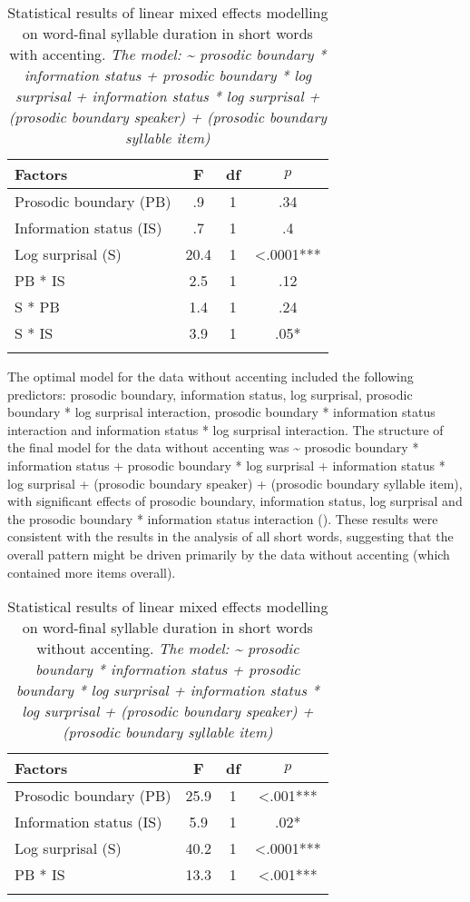 \documentclass[output=paper,colorlinks,citecolor=brown]{langscibook}
\begin{document}
\begin{table}
\begin{tabular}{l S[table-format=2.1] c S[table-format=<1.4{***}]}
\lsptoprule
 {F}actors & {F} & df & {$p$}\\ \midrule
 Prosodic boundary (PB) & .9 & 1 & .34\\
 Information status (IS) & .7 & 1 & .4\\
 Log surprisal (S) & 20.4 & 1 & <.0001{***}\\
 PB * IS & 2.5 & 1 & .12\\
 S * PB & 1.4 & 1 & .24\\
 S * IS & 3.9 & 1 & .05{*}\\
\lspbottomrule
\end{tabular}
\caption{Statistical results of linear mixed effects modelling on word-final syllable duration in short words with accenting. \textit{The model: {\textasciitilde} prosodic boundary * information status + prosodic boundary * log surprisal + information status * log surprisal + (prosodic boundary {\textbar} speaker) + (prosodic boundary {\textbar} syllable item)}}
\label{table:4}
\end{table}

The optimal model for the data without accenting included the following predictors: prosodic boundary, information status, log surprisal, prosodic boundary * log surprisal interaction, prosodic boundary * information status interaction and information status * log surprisal interaction. The structure of the final model for the data without accenting was {\textasciitilde} prosodic boundary * information status + prosodic boundary * log surprisal + information status * log surprisal + (prosodic boundary {\textbar} speaker) + (prosodic boundary {\textbar} syllable item), with significant effects of prosodic boundary, information status, log surprisal and the prosodic boundary * information status interaction (). These results were consistent with the results in the analysis of all short words, suggesting that the overall pattern might be driven primarily by the data without accenting (which contained more items overall).

\begin{table}
\begin{tabular}{l S[table-format=2.1] c S[table-format=<1.4{***}]}
\lsptoprule
 {F}actors & {F} & df & {$p$}\\ \midrule
 Prosodic boundary (PB) & 25.9 & 1 & <.001{***}\\
 Information status (IS) & 5.9 & 1 & .02{*}\\
 Log surprisal (S) & 40.2 & 1 & <.0001{***}\\
 PB * IS & 13.3 & 1 & <.001{***}\\
\lspbottomrule
\end{tabular}
\caption{Statistical results of linear mixed effects modelling on word-final syllable duration in short words without accenting. \textit{The model: {\textasciitilde} prosodic boundary * information status + prosodic boundary * log surprisal + information status * log surprisal + (prosodic boundary {\textbar} speaker) + (prosodic boundary {\textbar} syllable item)}}
\label{table:5}
\end{table}
\end{document}
